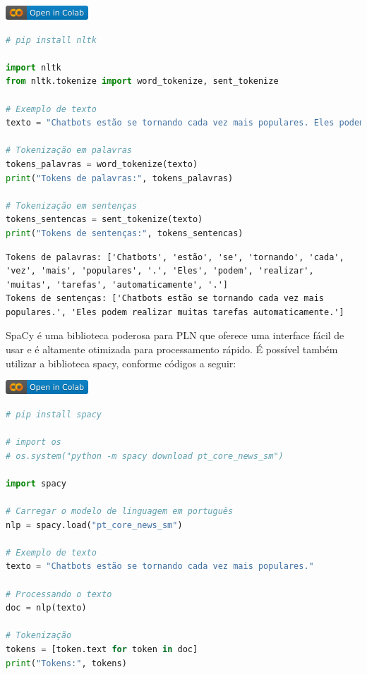 \documentclass[14pt,a4paper,oneside]{book}
\begin{document}
\vspace{\baselineskip}
\href{https://colab.research.google.com/github/giseldo/chatbotbook/blob/main/notebook/pln/pln1_1.ipynb}{
  \includegraphics{./fig/colab-badge.png}
}

\begin{lstlisting}[language=Python]
# pip install nltk

import nltk
from nltk.tokenize import word_tokenize, sent_tokenize

# Exemplo de texto
texto = "Chatbots estão se tornando cada vez mais populares. Eles podem realizar muitas tarefas automaticamente."

# Tokenização em palavras
tokens_palavras = word_tokenize(texto)
print("Tokens de palavras:", tokens_palavras)

# Tokenização em sentenças
tokens_sentencas = sent_tokenize(texto)
print("Tokens de sentenças:", tokens_sentencas)
\end{lstlisting}

\begin{lstlisting}
Tokens de palavras: ['Chatbots', 'estão', 'se', 'tornando', 'cada', 'vez', 'mais', 'populares', '.', 'Eles', 'podem', 'realizar', 'muitas', 'tarefas', 'automaticamente', '.']
Tokens de sentenças: ['Chatbots estão se tornando cada vez mais populares.', 'Eles podem realizar muitas tarefas automaticamente.']
\end{lstlisting}


SpaCy é uma biblioteca poderosa para PLN que oferece uma interface fácil de usar e é altamente otimizada para processamento rápido. É possível também utilizar a biblioteca spacy, conforme códigos a seguir:

\vspace{\baselineskip}
\href{https://colab.research.google.com/github/giseldo/chatbotbook/blob/main/notebook/pln/pln1_1_2.ipynb}{
  \includegraphics{./fig/colab-badge.png}
}

\begin{lstlisting}[language=Python]
# pip install spacy

# import os
# os.system("python -m spacy download pt_core_news_sm")

import spacy

# Carregar o modelo de linguagem em português
nlp = spacy.load("pt_core_news_sm")

# Exemplo de texto
texto = "Chatbots estão se tornando cada vez mais populares."

# Processando o texto
doc = nlp(texto)

# Tokenização
tokens = [token.text for token in doc]
print("Tokens:", tokens)
\end{lstlisting}
\end{document}
